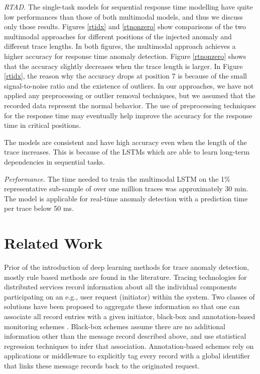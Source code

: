 \emph{RTAD.} The single-task models for sequential response time modelling have quite low performances than those of both multimodal models, and thus we discuss only those results. Figures \ref{rtidx} and \ref{rtnonzero} show comparisons of the two multimodal approaches for different positions of the injected anomaly and different trace lengths.  In both figures, the multimodal approach achieves a higher accuracy for response time anomaly detection. Figure \ref{rtnonzero} shows that the accuracy slightly decreases when the trace length is larger. In Figure \ref{rtidx}, the reason why the accuracy drops at position 7 is because of the small signal-to-noise ratio and the existence of outliers. In our approaches, we have not applied any preprocessing or outlier removal techniques, but we assumed that the recorded data represent the normal behavior. The use of preprocessing techniques for the response time may eventually help improve the accuracy for the response time in critical positions.

The models are consistent and have high accuracy even when the length of the trace increases. This is because of the LSTMs which are able to learn long-term dependencies in sequential tasks.

\emph{Performance.} The time needed to train the multimodal LSTM on the 1\% representative sub-sample of over one million traces was approximately 30 min. The model is applicable for real-time anomaly detection with a prediction time per trace below 50 ms.

\section{Related Work} \label{related_work}
Prior of the introduction of deep learning methods for trace anomaly detection, mostly rule based methods are found in the literature. 
Tracing technologies for distributed services record information about all the individual components participating on an e.g., user request (initiator) within the system.
Two classes of solutions have been proposed to aggregate these information so that one can associate all record entries with a given initiator, black-box and annotation-based monitoring schemes \cite{36356}. Black-box schemes \cite{reynolds2006wap5, bahl2007towards, aguilera2003performance} assume there are no additional information other than the message record described above, and use statistical regression techniques to infer that association. Annotation-based schemes \cite{gschwind2002webmon, Fonseca:2007:XPN:1973430.1973450, aguilera2003performance, barham2003magpie} rely on applications or middleware to explicitly tag every record with a global identifier that links these message records back to the originated request.


